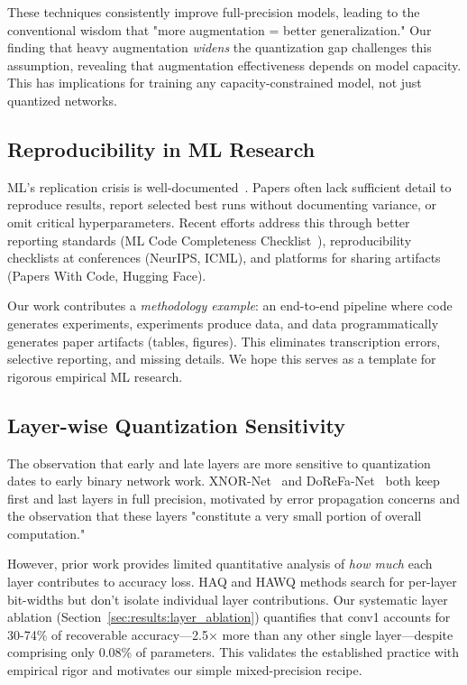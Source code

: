 These techniques consistently improve full-precision models, leading to the conventional wisdom that "more augmentation = better generalization." Our finding that heavy augmentation \textit{widens} the quantization gap challenges this assumption, revealing that augmentation effectiveness depends on model capacity. This has implications for training any capacity-constrained model, not just quantized networks.

\subsection{Reproducibility in ML Research}

ML's replication crisis is well-documented~\cite{gundersen2018reproducibility,hutson2018ai}. Papers often lack sufficient detail to reproduce results, report selected best runs without documenting variance, or omit critical hyperparameters. Recent efforts address this through better reporting standards (ML Code Completeness Checklist~\cite{dodge2019mlchecklist}), reproducibility checklists at conferences (NeurIPS, ICML), and platforms for sharing artifacts (Papers With Code, Hugging Face).

Our work contributes a \textit{methodology example}: an end-to-end pipeline where code generates experiments, experiments produce data, and data programmatically generates paper artifacts (tables, figures). This eliminates transcription errors, selective reporting, and missing details. We hope this serves as a template for rigorous empirical ML research.

\subsection{Layer-wise Quantization Sensitivity}

The observation that early and late layers are more sensitive to quantization dates to early binary network work. XNOR-Net~\cite{rastegari2016xnornet} and DoReFa-Net~\cite{zhou2016dorefa} both keep first and last layers in full precision, motivated by error propagation concerns and the observation that these layers "constitute a very small portion of overall computation."

However, prior work provides limited quantitative analysis of \textit{how much} each layer contributes to accuracy loss. HAQ and HAWQ methods search for per-layer bit-widths but don't isolate individual layer contributions. Our systematic layer ablation (Section~\ref{sec:results:layer_ablation}) quantifies that conv1 accounts for 30-74\% of recoverable accuracy—2.5× more than any other single layer—despite comprising only 0.08\% of parameters. This validates the established practice with empirical rigor and motivates our simple mixed-precision recipe.

